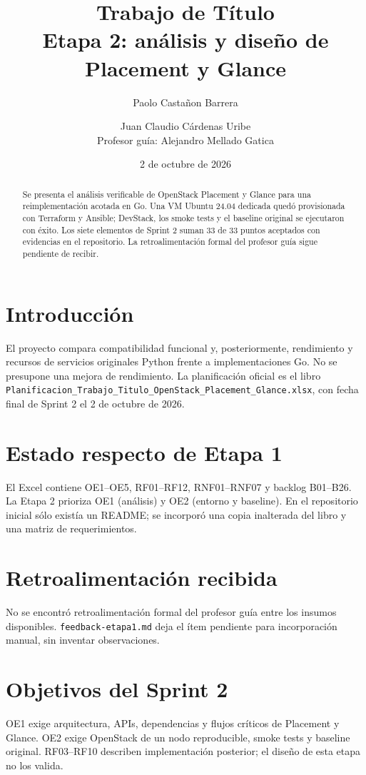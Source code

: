 \documentclass[10pt,a4paper]{article}
\title{Trabajo de Título\\Etapa 2: análisis y diseño de Placement y Glance}
\author{Paolo Castañon Barrera \and Juan Claudio Cárdenas Uribe\\Profesor guía: Alejandro Mellado Gatica}
\date{2 de octubre de 2026}
\begin{document}
\maketitle
\begin{abstract}
Se presenta el análisis verificable de OpenStack Placement y Glance para una reimplementación acotada en Go. Una VM Ubuntu 24.04 dedicada quedó provisionada con Terraform y Ansible; DevStack, los smoke tests y el baseline original se ejecutaron con éxito. Los siete elementos de Sprint 2 suman 33 de 33 puntos aceptados con evidencias en el repositorio. La retroalimentación formal del profesor guía sigue pendiente de recibir.
\end{abstract}
\tableofcontents

\section{Introducción}
El proyecto compara compatibilidad funcional y, posteriormente, rendimiento y recursos de servicios originales Python frente a implementaciones Go. No se presupone una mejora de rendimiento. La planificación oficial es el libro \texttt{Planificacion\_Trabajo\_Titulo\_OpenStack\_Placement\_Glance.xlsx}, con fecha final de Sprint 2 el 2 de octubre de 2026.

\section{Estado respecto de Etapa 1}
El Excel contiene OE1--OE5, RF01--RF12, RNF01--RNF07 y backlog B01--B26. La Etapa 2 prioriza OE1 (análisis) y OE2 (entorno y baseline). En el repositorio inicial sólo existía un README; se incorporó una copia inalterada del libro y una matriz de requerimientos.

\section{Retroalimentación recibida}
No se encontró retroalimentación formal del profesor guía entre los insumos disponibles. \texttt{feedback-etapa1.md} deja el ítem pendiente para incorporación manual, sin inventar observaciones.

\section{Objetivos del Sprint 2}
OE1 exige arquitectura, APIs, dependencias y flujos críticos de Placement y Glance. OE2 exige OpenStack de un nodo reproducible, smoke tests y baseline original. RF03--RF10 describen implementación posterior; el diseño de esta etapa no los valida.
\end{document}
